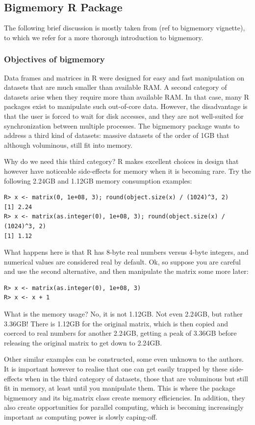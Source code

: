 \documentclass[a4paper,11pt]{amsart}
\begin{document}
\subsection{Bigmemory R Package}
The following brief discussion is mostly taken from (ref to bigmemory vignette), to which we refer for a more thorough introduction to bigmemory. 

\subsubsection{Objectives of bigmemory}
Data frames and matrices in R were designed for easy and fast manipulation on datasets that are much smaller than available RAM. A second category of datasets arise when they require more than available RAM. In that case, many R packages exist to manipulate such out-of-core data. However, the disadvantage is that the user is forced to wait for disk accesses, and they are not well-suited for synchronization between multiple processes. The bigmemory package wants to address a third kind of datasets: massive datasets of the order of 1GB that although voluminous, still fit into memory.

Why do we need this third category? R makes excellent choices in design that however have noticeable side-effects for memory when it is becoming rare. Try the following 2.24GB and 1.12GB memory consumption examples:
\begin{verbatim}
R> x <- matrix(0, 1e+08, 3); round(object.size(x) / (1024)^3, 2)
[1] 2.24
R> x <- matrix(as.integer(0), 1e+08, 3); round(object.size(x) / (1024)^3, 2)
[1] 1.12 
\end{verbatim}
What happens here is that R has 8-byte real numbers versus 4-byte integers, and numerical values are considered real by default. Ok, so suppose you are careful and use the second alternative, and then manipulate the matrix some more later:
\begin{verbatim}
R> x <- matrix(as.integer(0), 1e+08, 3)
R> x <- x + 1
\end{verbatim}
What is the memory usage? No, it is not 1.12GB. Not even 2.24GB, but rather 3.36GB! There is 1.12GB for the original matrix, which is then copied and coerced to real numbers for another 2.24GB, getting a peak of 3.36GB before releasing the original matrix to get down to 2.24GB. 

Other similar examples can be constructed, some even unknown to the authors. It is important however to realise that one can get easily trapped by these side-effects when in the third category of datasets, those that are voluminous but still fit in memory, at least until you manipulate them. This is where the package bigmemory and its big.matrix class create memory efficiencies. In addition, they also create opportunities for parallel computing, which is becoming increasingly important as computing power is slowly caping-off. 
\end{document}
